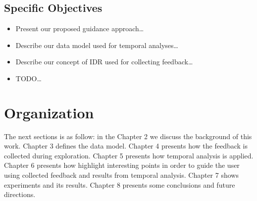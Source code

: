 \subsection{Specific Objectives}

\begin{itemize}
	\item Present our proposed guidance approach\ldots
	\item Describe our data model used for temporal analyses\ldots
	\item Describe our concept of IDR used for collecting feedback\ldots
	\item TODO\ldots
\end{itemize}

\section{Organization}

The next sections is as follow: in the Chapter 2 we discuss the background of this work.
Chapter 3 defines the data model.
Chapter 4 presents how the feedback is collected during exploration.
Chapter 5 presents how temporal analysis is applied.
Chapter 6 presents how highlight interesting points in order to guide the user using collected feedback and results from temporal analysis.
Chapter 7 shows experiments and its results.
Chapter 8 presents some conclusions and future directions.
